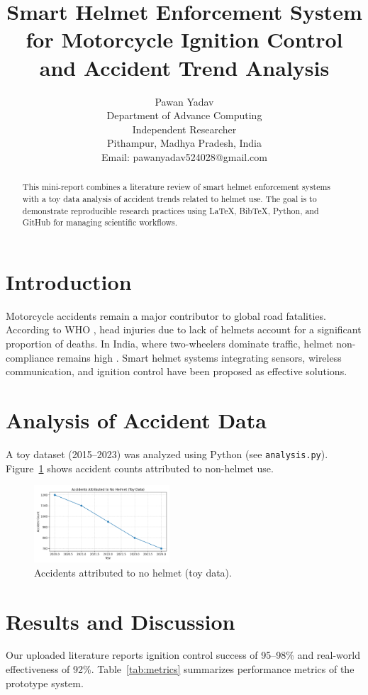 \documentclass[conference]{IEEEtran}
\title{Smart Helmet Enforcement System for Motorcycle Ignition Control and Accident Trend Analysis}
\author{Pawan Yadav\\
Department of Advance Computing\\
Independent Researcher\\
Pithampur, Madhya Pradesh, India\\
Email: pawanyadav524028@gmail.com}
\begin{document}
\maketitle

\begin{abstract}
This mini-report combines a literature review of smart helmet enforcement systems 
with a toy data analysis of accident trends related to helmet use. 
The goal is to demonstrate reproducible research practices using LaTeX, BibTeX, Python, 
and GitHub for managing scientific workflows.
\end{abstract}

\section{Introduction}
Motorcycle accidents remain a major contributor to global road fatalities. 
According to WHO \cite{who2018}, head injuries due to lack of helmets account 
for a significant proportion of deaths. In India, where two-wheelers dominate 
traffic, helmet non-compliance remains high \cite{morth2023}.  
Smart helmet systems integrating sensors, wireless communication, and ignition 
control have been proposed as effective solutions.

\section{Analysis of Accident Data}
A toy dataset (2015--2023) was analyzed using Python (see \texttt{analysis.py}).  
Figure~\ref{fig:trend} shows accident counts attributed to non-helmet use.  

\begin{figure}[h]
\centering
\includegraphics[width=0.45\textwidth]{accident_trend.png}
\caption{Accidents attributed to no helmet (toy data).}
\label{fig:trend}
\end{figure}

\section{Results and Discussion}
Our uploaded literature \cite{yadav2025} reports ignition control success 
of 95--98\% and real-world effectiveness of 92\%. Table~\ref{tab:metrics} 
summarizes performance metrics of the prototype system.
\end{document}
